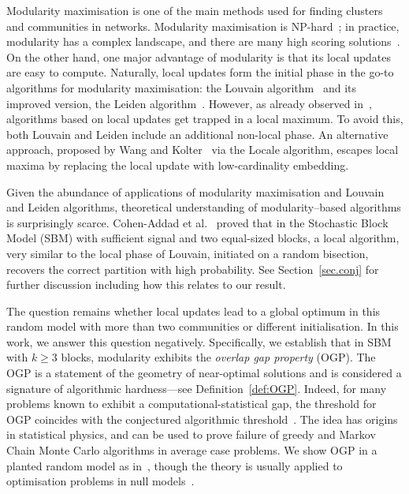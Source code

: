 \documentclass[a4paper,UKenglish,cleveref, autoref, thm-restate,numberwithinsect]{lipics-v2021}
\begin{document}
Modularity maximisation \cite{newman2006modularity,NewmanGirvan} is one of the main methods used for finding clusters and communities in networks. Modularity maximisation is NP-hard~\cite{brandes2007modularity}; in practice, modularity has a complex landscape, and there are many high scoring solutions~\cite{good2010performance}. On the other hand, one major advantage of modularity is that its local updates are easy to compute. Naturally, local updates form the initial phase in the go-to algorithms for modularity maximisation: the Louvain algorithm~\cite{blondel2008fast} and its improved version, the Leiden algorithm~\cite{traag2019louvain}. However, as already observed in~\cite{blondel2008fast}, algorithms based on local updates get trapped in a local maximum. To avoid this, both Louvain and Leiden include an additional non-local phase. An alternative approach, proposed by Wang and Kolter~\cite{wang2020community} via the Locale algorithm, escapes local maxima by replacing the local update with low-cardinality embedding.  

Given the abundance of applications of modularity maximisation and Louvain and Leiden algorithms, theoretical understanding of modularity--based algorithms is surprisingly scarce. Cohen-Addad et al.~\cite{cohen2020power} proved that in the Stochastic Block Model (SBM) with sufficient signal and two equal-sized blocks, a local algorithm, very similar to the local phase of Louvain, initiated on a random bisection, recovers the correct partition with high probability. See Section~\ref{sec.conj} for further discussion including how this relates to our result.  

The question remains whether local updates lead to a global optimum in this random model with more than two communities or different initialisation. In this work, we answer this question negatively. Specifically, we establish that in SBM with $k \ge 3$ blocks,  modularity exhibits the {\it overlap gap property} (OGP). 
The OGP is a statement of the geometry of near-optimal solutions and is considered a signature of algorithmic hardness---see Definition~\ref{def:OGP}. 
Indeed, for many problems known to exhibit a computational-statistical gap, the threshold for OGP coincides with the conjectured algorithmic threshold~\cite{gamarnikAMSNotices,gamarnik2022disordered}. The idea has origins in statistical physics, and can be used to prove failure of greedy and Markov Chain Monte Carlo algorithms in average case problems. We show OGP in a planted random model as in~\cite{gamarnik2022sparse,gamarnik2021overlap}, though the theory is usually applied to optimisation problems in null models~\cite{gamarnikAMSNotices}. 
\end{document}
